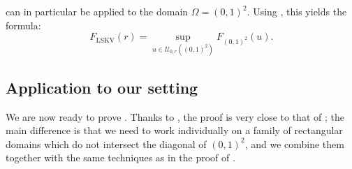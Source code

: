 \documentclass{article}
\theoremstyle{remark}
\def\LSKV{\mathrm{LSKV}}
\def\opencarre{(0,1)^2}
\def\Usjo{\mathcal{U}}
\begin{document}
 can in particular be applied to the domain $\Omega = \opencarre$.
Using , this yields the formula:
\begin{equation}\label{eq: F_LSKV via Sjo}
    F_\LSKV(r) = \sup_{u\in \Usjo_{0,r}\left(\opencarre\right)} F_{\opencarre}(u) .
\end{equation}


\subsection{Application to our setting}\label{sec: proof RS our setting}

We are now ready to prove .
Thanks to , the proof is very close to that of ;
the main difference is that we need to work individually on a family of rectangular domains which do not intersect the diagonal of $\opencarre$, and we combine them together with the same techniques as in the proof of .
\end{document}
